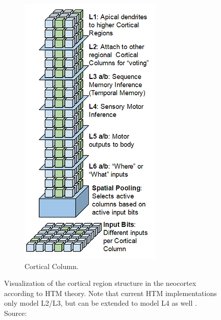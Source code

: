 \begin{figure}[H]
\begin{subfigure}{0.35\textwidth}
        \includegraphics[width=\textwidth]{resources/related_works/cortical_column.png}
        \caption{Cortical Column.}
    \end{subfigure}

    \caption{Visualization of the cortical region structure in the neocortex according to HTM theory. Note that current HTM implementations only model L2/L3, but can be extended to model L4 as well \cite{htm_l2_l3}. Source: \cite{cortical_region}}
    \label{fig:cortical_region}
\end{figure}
